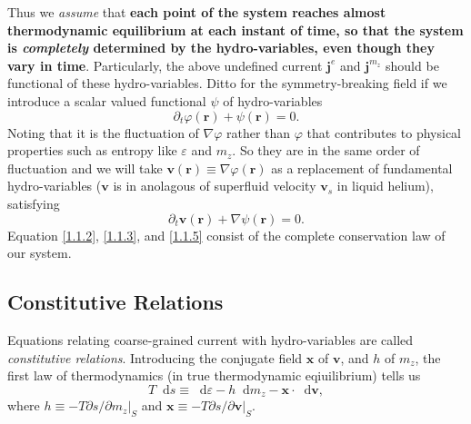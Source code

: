 \documentclass[10pt,nofootinbib]{revtex4}
\newcommand*\dd{\mathop{}\!\mathrm{d}}
\begin{document}
		Thus we \emph{assume} that {\bf each point of the system reaches almost thermodynamic equilibrium at each instant of time, so that the system is \emph{completely} determined by the hydro-variables, even though they vary in time}. Particularly, the above undefined current $\bm{j}^e$ and $\bm{j}^{m_z}$ should be functional of these hydro-variables. Ditto for the symmetry-breaking field if we introduce a scalar valued functional $\psi$ of hydro-variables
		\begin{equation}\label{1.1.4}
			\partial_t \varphi(\bm{r})+\psi(\bm{r})=0.
		\end{equation}
		Noting that it is the fluctuation of $\nabla\varphi$ rather than $\varphi$ that contributes to physical properties such as entropy like $\varepsilon$ and $m_z$. So they are in the same order of fluctuation and we will take $\bm{v}(\bm{r})\equiv\nabla\varphi(\bm{r})$ as a replacement of fundamental hydro-variables ($\bm{v}$ is in anolagous of superfluid velocity $\bm{v}_s$ in liquid helium), satisfying
		\begin{equation}\label{1.1.5}
			\partial_t\bm{v}(\bm{r})+\nabla\psi(\bm{r})=0.
		\end{equation}
		Equation \eqref{1.1.2}, \eqref{1.1.3}, and \eqref{1.1.5} consist of the complete conservation law of our system.

	\subsection{Constitutive Relations}
		Equations relating coarse-grained current with hydro-variables are called \emph{constitutive relations}. Introducing the conjugate field $\bm{x}$ of $\bm{v}$, and $h$ of $m_z$, the first law of thermodynamics (in true thermodynamic eqiuilibrium) tells us
		\begin{equation}\label{2.0.1}
			T\dd s\equiv\dd \varepsilon-h\dd m_z-\bm{x}\cdot\dd\bm{v},
		\end{equation}
		where $h\equiv-T \partial s/\partial m_z|_S$ and $\bm{x}\equiv-T\partial s/\partial \bm{v}|_S$. 
\end{document}
